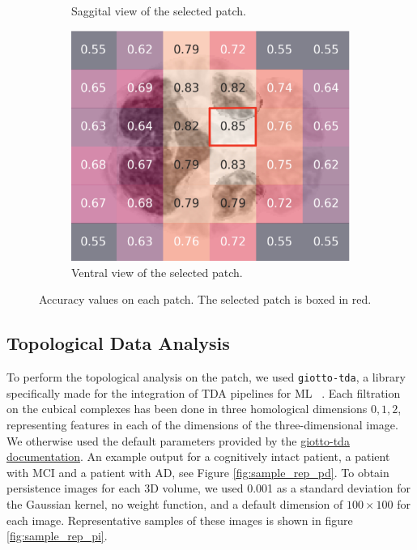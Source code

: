 \documentclass{article}
\begin{document}
\begin{figure}[b]
\begin{subfigure}{0.32\textwidth}
    \caption{Saggital view of the selected patch.}
  \end{subfigure}
  \hfill
  \begin{subfigure}{0.32\textwidth}
    \includegraphics[width=\textwidth]{figures/perf_ventral.png}
    \caption{Ventral view of the selected patch.}
  \end{subfigure}
  \caption{Accuracy values on each patch. The selected patch is boxed in red.}
  \label{fig:acc}
\end{figure}

\subsection{Topological Data Analysis}\label{sec:tda_setup}

To perform the topological analysis on the patch, we used \texttt{giotto-tda}, a library specifically made for the integration of TDA pipelines for ML ~\citep{tauzin2020giottotda}. Each filtration on the cubical complexes has been done in three homological dimensions $0,1,2$, representing features in each of the dimensions of the three-dimensional image. We otherwise used the default parameters provided by the \href{https://giotto-ai.github.io/gtda-docs/latest/modules/generated/homology/gtda.homology.CubicalPersistence.html#id2}{giotto-tda documentation}. An example output for a cognitively intact patient, a patient with MCI and a patient with AD, see Figure \ref{fig:sample_rep_pd}. To obtain persistence images for each 3D volume, we used 0.001 as a standard deviation for the Gaussian kernel, no weight function, and a default dimension of $100 \times 100$ for each image. Representative samples of these images is shown in figure \ref{fig:sample_rep_pi}.
\end{document}
